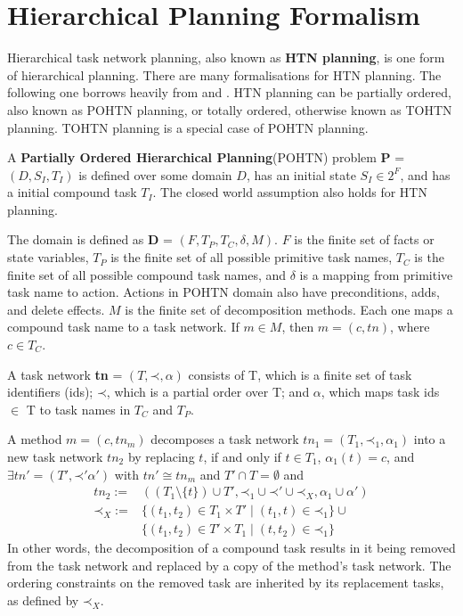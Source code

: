 \documentclass[letterpaper]{article} %
\newcommand{\singlePrec} {\ensuremath{\mathit{ \mathord{\prec} }}}
\begin{document}
\section{Hierarchical Planning Formalism}
Hierarchical task network planning, also known as \textbf{HTN planning}, is one form of hierarchical planning. There are many formalisations for HTN planning. The following one borrows heavily from \cite{HTNSurvey} and \cite{Geier2011TIHTNDecidability}. HTN planning can be partially ordered, also known as POHTN planning, or totally ordered, otherwise known as TOHTN planning. TOHTN planning is a special case of POHTN planning.  %

A \textbf{Partially Ordered Hierarchical Planning}(POHTN) problem \textbf{P} = $(D, S_I, T_I)$
is defined over some domain $D$, 
has an initial state $S_I \in 2^F$, and 
has a initial compound task $T_I$. 
The closed world assumption also holds for HTN planning.

The domain is defined as \textbf{D} = $(F, T_P, T_C, \delta, M)$.
$F$ is the finite set of facts or state variables, $T_P$ is the finite set of all possible primitive task names, $T_C$ is the finite set of all possible compound task names, and
$\delta$ is a mapping from primitive task name to action. Actions in POHTN domain also have preconditions, adds, and delete effects.
$M$ is the finite set of decomposition methods. Each one maps a compound task name to a task network. If $m \in M$, then $m=(c, tn)$, where $c \in T_C$.

A task network \textbf{tn} = $(T, \singlePrec, \alpha)$ consists of
T, which is a finite set of task identifiers (ids); 
$\singlePrec$, which is a partial order over T; and
$\alpha$, which maps task ids $\in$ T to task names in $T_C$ and $T_P$. 

A method $m = (c, tn_m)$ decomposes a task network $tn_1 = (T_1, \singlePrec_1, \alpha_1)$ into
a new task network $tn_2$ by replacing $t$, if and only if $t \in T_1$, $\alpha_1(t) = c$, and $\exists tn' = (T', \singlePrec' \alpha')$ with $tn' \cong tn_m$ and $T' \cap T = \emptyset$ and
\begin{align}
tn_2 :=     &((T_1 \setminus \{t\}) \cup T',    \singlePrec_1 \cup \singlePrec' \cup \singlePrec_X,        \alpha_1 \cup \alpha') \\
\singlePrec_X :=  &\{(t_1, t_2) \in T_1 \times T'  \mid  (t_1,t) \in \singlePrec_1 \} \cup \\
&\{(t_1, t_2) \in T' \times T_1 \mid (t, t_2) \in \singlePrec_1 \}  
\end{align}
In other words, the decomposition of a compound task results in it being removed from the task network and replaced by a copy of the method’s task network. The ordering constraints
on the removed task are inherited by its replacement tasks, as defined by $\singlePrec_X$. 
\end{document}
